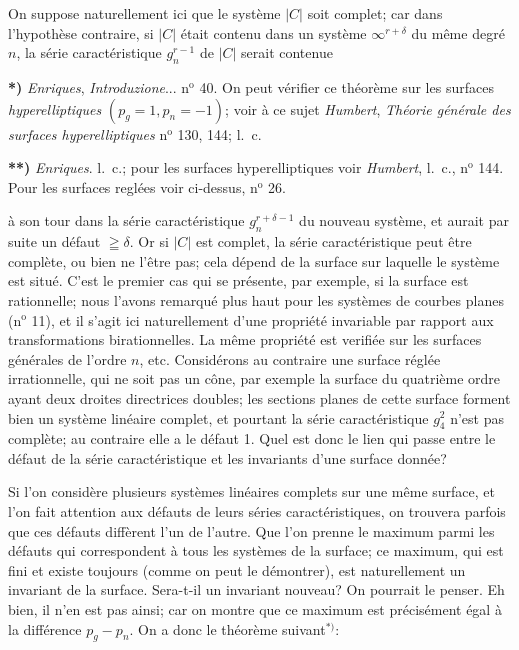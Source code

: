 \documentclass{article}
\begin{document}
On suppose naturellement ici que le système $|C|$ soit complet; car dans l'hypothèse contraire, si $|C|$ était contenu dans un système $\infty^{r+\delta}$ du même degré $n$, la série caractéristique $g_{n}^{r-1}$ de $|C|$ serait contenue

\textbf{*)} \emph{Enriques}, \emph{Introduzione}... n${}^{\text{o}}$ 40. On peut vérifier ce théorème sur les surfaces \emph{hyperelliptiques} $(p_{g} = 1, p_{n} = -1)$; voir à ce sujet \emph{Humbert}, \emph{Théorie générale des surfaces hyperelliptiques} n${}^{\text{o}}$ 130, 144; l.\ c.

\textbf{**)} \emph{Enriques}. l.\ c.; pour les surfaces hyperelliptiques voir \emph{Humbert}, l.\ c., n${}^{\text{o}}$ 144. Pour les surfaces reglées voir ci-dessus, n${}^{\text{o}}$ 26.

à son tour dans la série caractéristique $g_{n}^{r+\delta-1}$ du nouveau système, et aurait par suite un défaut $\geqq \delta$. Or si $|C|$ est complet, la série caractéristique peut être complète, ou bien ne l'être pas; cela dépend de la surface sur laquelle le système est situé. C'est le premier cas qui se présente, par exemple, si la surface est rationnelle; nous l'avons remarqué plus haut pour les systèmes de courbes planes (n${}^{\text{o}}$ 11), et il s'agit ici naturellement d'une propriété invariable par rapport aux transformations birationnelles. La même propriété est verifiée sur les surfaces générales de l'ordre $n$, etc. Considérons au contraire une surface réglée irrationnelle, qui ne soit pas un cône, par exemple la surface du quatrième ordre ayant deux droites directrices doubles; les sections planes de cette surface forment bien un système linéaire complet, et pourtant la série caractéristique $g_{4}^{2}$ n'est pas complète; au contraire elle a le défaut 1. Quel est donc le lien qui passe entre le défaut de la série caractéristique et les invariants d'une surface donnée?

Si l'on considère plusieurs systèmes linéaires complets sur une même surface, et l'on fait attention aux défauts de leurs séries caractéristiques, on trouvera parfois que ces défauts diffèrent l'un de l'autre. Que l'on prenne le maximum parmi les défauts qui correspondent à tous les systèmes de la surface; ce maximum, qui est fini et existe toujours (comme on peut le démontrer), est naturellement un invariant de la surface. Sera-t-il un invariant nouveau? On pourrait le penser. Eh bien, il n'en est pas ainsi; car on montre que ce maximum est précisément égal à la différence $p_{g} - p_{n}$. On a donc le théorème suivant${}^{*)}$:
\end{document}
